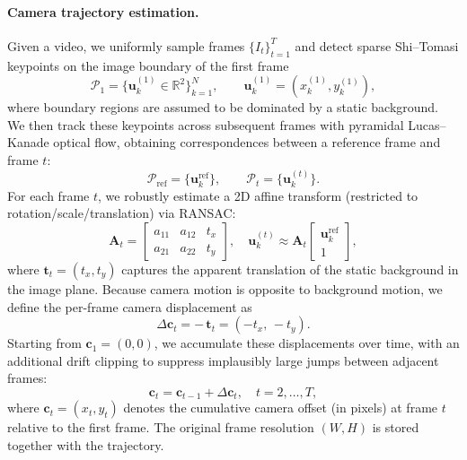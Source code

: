 \paragraph{Camera trajectory estimation.}
   Given a video, we uniformly sample frames $\{I_t\}_{t=1}^{T}$ and detect sparse Shi--Tomasi keypoints on the image boundary of the first frame 
   \[ \mathcal{P}_1 = \big\{\mathbf{u}_k^{(1)} \in \mathbb{R}^2\big\}_{k=1}^{N}, \qquad \mathbf{u}_k^{(1)} = (x_k^{(1)}, y_k^{(1)}), 
   \]
    where boundary regions are assumed to be dominated by a static background. We then track these keypoints across subsequent frames with pyramidal Lucas--Kanade optical flow, obtaining correspondences between a reference frame and frame $t$:
    \[
        \mathcal{P}_{\text{ref}} = \{\mathbf{u}_k^{\text{ref}}\}, \qquad
        \mathcal{P}_t = \{\mathbf{u}_k^{(t)}\}.
    \]
    For each frame $t$, we robustly estimate a 2D affine transform (restricted to rotation/scale/translation) via RANSAC:
    \[
        \mathbf{A}_t =
        \begin{bmatrix}
            a_{11} & a_{12} & t_x \\
            a_{21} & a_{22} & t_y
        \end{bmatrix}, \quad
        \mathbf{u}_k^{(t)} \approx \mathbf{A}_t
        \begin{bmatrix}
            \mathbf{u}_k^{\text{ref}} \\ 1
        \end{bmatrix},
    \]
    where $\mathbf{t}_t = (t_x, t_y)$ captures the apparent translation of the static background in the image plane. Because camera motion is opposite to background motion, we define the per-frame camera displacement as
    \[
        \Delta \mathbf{c}_t = -\,\mathbf{t}_t = (-t_x,\,-t_y).
    \]
    Starting from $\mathbf{c}_1 = (0,0)$, we accumulate these displacements over time, with an additional drift clipping to suppress implausibly large jumps between adjacent frames:
    \[
        \mathbf{c}_t = \mathbf{c}_{t-1} + \Delta \mathbf{c}_t, \quad t = 2,\dots,T,
    \]
    where $\mathbf{c}_t = (x_t, y_t)$ denotes the cumulative camera offset (in pixels) at frame $t$ relative to the first frame. The original frame resolution $(W, H)$ is stored together with the trajectory.

